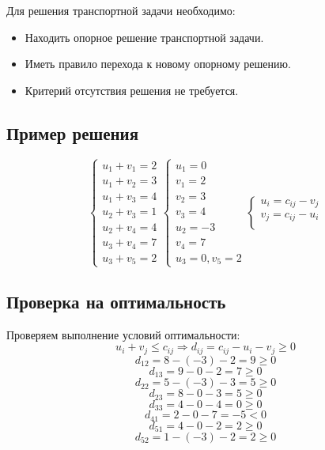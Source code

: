 \documentclass[17pt]{extarticle}
\begin{document}
Для решения транспортной задачи необходимо:
\begin{itemize}
    \item Находить опорное решение транспортной задачи.
    \item Иметь правило перехода к новому опорному решению.
    \item Критерий отсутствия решения не требуется.
\end{itemize}

\subsection{Пример решения}
\[
    \begin{cases}
        u_1 + v_1 = 2 \\
        u_1 + v_2 = 3 \\
        u_1 + v_3 = 4 \\
        u_2 + v_3 = 1 \\
        u_2 + v_4 = 4 \\
        u_3 + v_4 = 7 \\
        u_3 + v_5 = 2
    \end{cases}
    \begin{cases}
        u_1 = 0  \\
        v_1 = 2  \\
        v_2 = 3  \\
        v_3 = 4  \\
        u_2 = -3 \\
        v_4 = 7  \\
        u_3 = 0, v_5 = 2
    \end{cases}
    \begin{cases}
        u_i = c_{ij} - v_j \\
        v_j = c_{ij} - u_i \\
    \end{cases}
\]
\subsection{Проверка на оптимальность}
Проверяем выполнение условий оптимальности:
\[
    u_i + v_j \leq c_{ij} \Rightarrow d_{ij} = c_{ij} - u_i - v_j \geq 0
\]
\[
    d_{12} = 8 - (-3) - 2 = 9 \geq 0
\]
\[
    d_{13} = 9 - 0 - 2 = 7 \geq 0
\]
\[
    d_{22} = 5 - (-3) - 3 = 5 \geq 0
\]
\[
    d_{23} = 8 - 0 - 3 = 5 \geq 0
\]
\[
    d_{33} = 4 - 0 - 4 = 0 \geq 0
\]
\[
    d_{41} = 2 - 0 - 7 = -5 < 0
\]
\[
    d_{51} = 4 - 0 - 2 = 2 \geq 0
\]
\[
    d_{52} = 1 - (-3) - 2 = 2 \geq 0
\]
\end{document}
